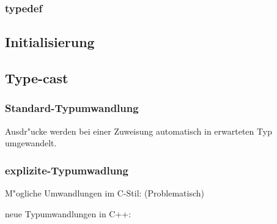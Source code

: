		\subsubsection{typedef}
			

	\subsection{Initialisierung}
		 
	\subsection{Type-cast}
	\subsubsection{Standard-Typumwandlung}
	Ausdr"ucke werden bei einer Zuweisung automatisch in erwarteten Typ umgewandelt.
		 
	\subsubsection{explizite-Typumwadlung}
	 M"ogliche Umwandlungen im C-Stil: (Problematisch)
		 
	 neue Typumwandlungen in C++:
		 